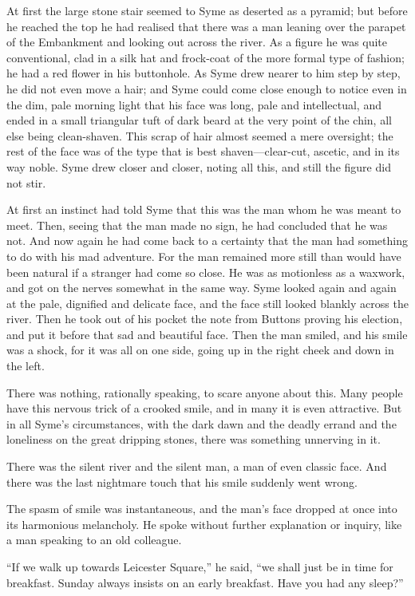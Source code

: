 At first the large stone stair seemed to Syme as deserted as a pyramid; but before he reached the top he had realised that there was a man leaning over the parapet of the Embankment and looking out across the river. As a figure he was quite conventional, clad in a silk hat and frock-coat of the more formal type of fashion; he had a red flower in his buttonhole. As Syme drew nearer to him step by step, he did not even move a hair; and Syme could come close enough to notice even in the dim, pale morning light that his face was long, pale and intellectual, and ended in a small triangular tuft of dark beard at the very point of the chin, all else being clean-shaven. This scrap of hair almost seemed a mere oversight; the rest of the face was of the type that is best shaven⁠—clear-cut, ascetic, and in its way noble. Syme drew closer and closer, noting all this, and still the figure did not stir.

At first an instinct had told Syme that this was the man whom he was meant to meet. Then, seeing that the man made no sign, he had concluded that he was not. And now again he had come back to a certainty that the man had something to do with his mad adventure. For the man remained more still than would have been natural if a stranger had come so close. He was as motionless as a waxwork, and got on the nerves somewhat in the same way. Syme looked again and again at the pale, dignified and delicate face, and the face still looked blankly across the river. Then he took out of his pocket the note from Buttons proving his election, and put it before that sad and beautiful face. Then the man smiled, and his smile was a shock, for it was all on one side, going up in the right cheek and down in the left.

There was nothing, rationally speaking, to scare anyone about this. Many people have this nervous trick of a crooked smile, and in many it is even attractive. But in all Syme’s circumstances, with the dark dawn and the deadly errand and the loneliness on the great dripping stones, there was something unnerving in it.

There was the silent river and the silent man, a man of even classic face. And there was the last nightmare touch that his smile suddenly went wrong.

The spasm of smile was instantaneous, and the man’s face dropped at once into its harmonious melancholy. He spoke without further explanation or inquiry, like a man speaking to an old colleague.

“If we walk up towards Leicester Square,” he said, “we shall just be in time for breakfast. Sunday always insists on an early breakfast. Have you had any sleep?”

